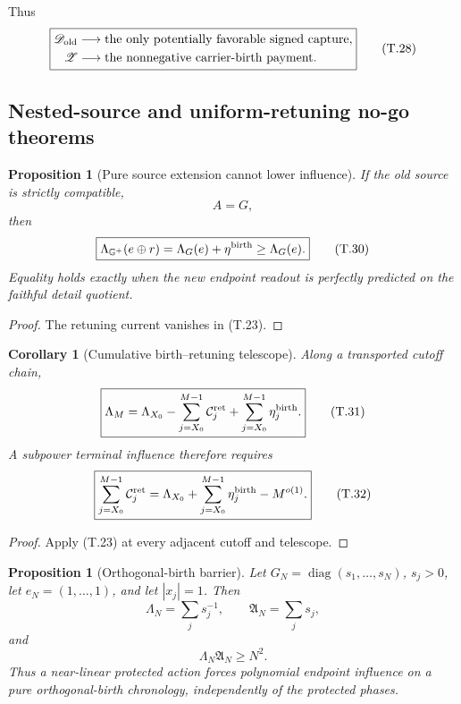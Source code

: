 \documentclass[11pt]{article}
\newtheorem{proposition}[theorem]{Proposition}
\newtheorem{corollary}[theorem]{Corollary}
\theoremstyle{definition}
\theoremstyle{remark}
\newcommand{\diag}{\operatorname{diag}}
\begin{document}
Thus
\[
 \boxed{
 \begin{aligned}
 \mathscr D_{\rm old}
 &\longrightarrow\text{the only potentially favorable signed capture},\\
 \mathscr Z
 &\longrightarrow\text{the nonnegative carrier-birth payment}.
 \end{aligned}}
 \tag{T.28}
\]

\subsection{Nested-source and uniform-retuning no-go theorems}
\label{subsec:birth-no-go}

\begin{proposition}[Pure source extension cannot lower influence]
\label{cth:birth-nested-source}
If the old source is strictly compatible,
\[
 \boxed{A=G,}
 \tag{T.29}
\]
then
\[
 \boxed{
 \Lambda_{\mathbb G^+}(e\oplus r)
 =\Lambda_G(e)+\eta^{\rm birth}\ge\Lambda_G(e).}
 \tag{T.30}
\]
Equality holds exactly when the new endpoint readout is perfectly predicted
on the faithful detail quotient.
\end{proposition}

\begin{proof}
The retuning current vanishes in \textup{(T.23)}.
\end{proof}

\begin{corollary}[Cumulative birth--retuning telescope]
\label{cor:birth-telescope}
Along a transported cutoff chain,
\[
 \boxed{
 \Lambda_M
 =\Lambda_{X_0}
  -\sum_{j=X_0}^{M-1}\mathcal C_j^{\rm ret}
  +\sum_{j=X_0}^{M-1}\eta_j^{\rm birth}.}
 \tag{T.31}
\]
A subpower terminal influence therefore requires
\[
 \boxed{
 \sum_{j=X_0}^{M-1}\mathcal C_j^{\rm ret}
 =\Lambda_{X_0}
  +\sum_{j=X_0}^{M-1}\eta_j^{\rm birth}
  -M^{o(1)}.}
 \tag{T.32}
\]
\end{corollary}

\begin{proof}
Apply \textup{(T.23)} at every adjacent cutoff and telescope.
\end{proof}

\begin{proposition}[Orthogonal-birth barrier]
\label{cth:birth-orthogonal-birth}
Let
\(G_N=\diag(s_1,\ldots,s_N)\), \(s_j>0\), let
\(e_N=(1,\ldots,1)\), and let \(|x_j|=1\).  Then
\[
 \boxed{
 \Lambda_N=\sum_js_j^{-1},
 \qquad
 \mathfrak A_N=\sum_js_j,}
 \tag{T.33}
\]
and
\[
 \boxed{\Lambda_N\mathfrak A_N\ge N^2.}
 \tag{T.34}
\]
Thus a near-linear protected action forces polynomial endpoint influence on a
pure orthogonal-birth chronology, independently of the protected phases.
\end{proposition}
\end{document}

